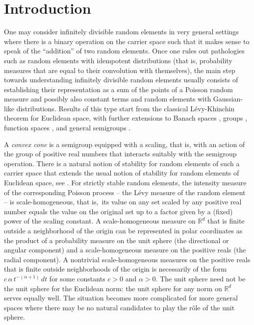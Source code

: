 \documentclass[12pt]{amsart}
\numberwithin{equation}{section}
\numberwithin{figure}{section}
\theoremstyle{plain} \newtheorem{theorem}{Theorem}[section]
\theoremstyle{plain} \newtheorem{proposition}[theorem]{Proposition}
\theoremstyle{plain} \newtheorem{lemma}[theorem]{Lemma}
\theoremstyle{plain} \newtheorem{corollary}[theorem]{Corollary}
\theoremstyle{definition} \newtheorem{definition}[theorem]{Definition}
\theoremstyle{definition} \newtheorem{notation}[theorem]{Notation}
\theoremstyle{remark} \newtheorem{remark}[theorem]{Remark}
\theoremstyle{remark} \newtheorem{example}[theorem]{Example}
\theoremstyle{definition} \newtheorem{assumption}{Assumption}
\newcommand{\bR}{\mathbb{R}}
\begin{document}
\maketitle

\section{Introduction}
\label{sec:introduction}

One may consider infinitely divisible random elements in very general
settings where there is a binary operation on the carrier space such
that it makes sense to speak of the ``addition'' of two random
elements.  Once one rules out pathologies such as random elements with
idempotent distributions (that is, probability measures that are equal
to their convolution with themselves), the main step towards
understanding infinitely divisible random elements usually consists of
establishing their representation as a sum of the points of a Poisson
random measure and possibly also constant terms and random elements
with Gaussian-like distributions. Results of this type start from the
classical L\'evy-Khinchin theorem for Euclidean space, with further
extensions to Banach spaces \cite{arauj:gin80,ros90}, groups
\cite{par67}, function spaces \cite{bas:ros13,kab:stoev12,raj:ros89},
and general semigroups \cite{MR974112}.

A {\em convex cone} is a semigroup equipped with a scaling, that is,
with an action of the group of positive real numbers that interacts
suitably with the semigroup operation.  There is a natural notion of
stability for random elements of such a carrier space that extends the
usual notion of stability for random elements of Euclidean space, see
\cite{dav:mol:zuy08}.  For strictly stable random elements, the
intensity measure of the corresponding Poisson process -- the L\'evy
measure of the random element -- is scale-homogeneous, that is,\ its value
on any set scaled by any positive real number equals the value on the
original set up to a factor given by a (fixed) power of the scaling
constant.  A scale-homogeneous measure on $\bR^d$ that is finite
outside a neighborhood of the origin can be represented in polar
coordinates as the product of a probability measure on the unit sphere
(the directional or angular component) and a scale-homogeneous measure
on the positive reals (the radial component). A nontrivial
scale-homogeneous measures on the positive reals that is finite
outside neighborhoods of the origin is necessarily of the form $c \,
\alpha \, t^{-(\alpha + 1)} \, dt$ for some constants $c > 0$ and
$\alpha > 0$.  The unit sphere need not be the unit sphere for the
Euclidean norm: the unit sphere for any norm on $\bR^d$ serves equally
well.  The situation becomes more complicated for more general spaces
where there may be no natural candidates to play the r\^ole of the
unit sphere.
\end{document}
